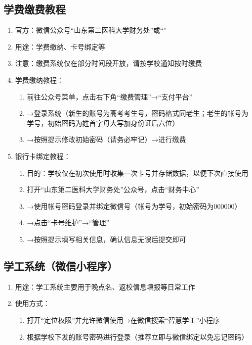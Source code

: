 \subsection[学费缴费教程]{学费缴费教程}
\label{fee_pay}
\begin{enumerate}
    \item 官方：微信公众号“山东第二医科大学财务处”或“”
    \item 用途：学费缴纳、卡号绑定等
    \item 注意：缴费系统仅在部分时间段开放，请按学校通知按时缴费
    \item 学费缴纳教程：
          \begin{enumerate}
              \item 前往公众号菜单，点击右下角“缴费管理”→“支付平台”
              \item →登录系统（新生的账号为高考考生号，密码格式同老生；老生的帐号为学号，初始密码为姓首字母大写加身份证后六位）
              \item →按照提示修改初始密码（请务必牢记）→进行缴费
          \end{enumerate}
    \item 银行卡绑定教程：
          \begin{enumerate}
              \item 目的：学校仅在初次使用时收集一次卡号并存储数据，以便下次直接使用\footnotemark
              \item 打开“山东第二医科大学财务处”公众号，点击“财务中心”
              \item →使用帐号密码登录并绑定微信号（帐号为学号，初始密码为000000）
              \item →点击“卡号维护”→“管理”
              \item →按照提示填写相关信息，确认信息无误后提交即可
          \end{enumerate}
\end{enumerate}

\subsection[学工系统（微信小程序）]{学工系统（微信小程序）}
\begin{enumerate}
    \item 用途：学工系统主要用于晚点名、返校信息填报等日常工作\footnotemark
    \item 使用方式：
          \begin{enumerate}
              \item 打开“定位权限”并允许微信使用→在微信搜索“智慧学工”小程序
              \item 根据学校下发的账号密码进行登录（推荐立即与微信绑定以免忘记密码）
          \end{enumerate}
\end{enumerate}

